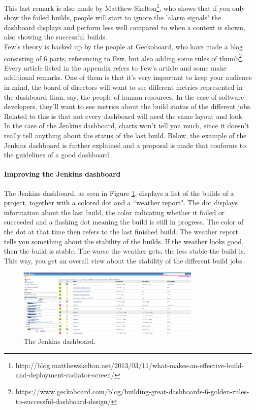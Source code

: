 \documentclass[10pt,a4paper]{article}
\begin{document}
\begin{appendices}
This last remark is also made by Matthew Skelton\footnote{http://blog.matthewskelton.net/2013/03/11/what-makes-an-effective-build-and-deployment-radiator-screen/}, who shows that if you only show the failed builds, people will start to ignore the 'alarm signals' the dashboard displays and perform less well compared to when a context is shown, also showing the successful builds. \\
Few’s theory is backed up by the people at Geckoboard, who have made a blog consisting of 6 parts, referencing to Few, but also adding some rules of thumb\footnote{https://www.geckoboard.com/blog/building-great-dashboards-6-golden-rules-to-successful-dashboard-design/}. Every article listed in the appendix refers to Few’s article and some make additional remarks. 
One of them is that it’s very important to keep your audience in mind, the board of directors will want to see different metrics represented in the dashboard than, say, the people of human resources. 
In the case of software developers, they’ll want to see metrics about the build status of the different jobs. Related to this is that not every dashboard will need the same layout and look. \\
In the case of the Jenkins dashboard, charts won’t tell you much, since it doesn’t really tell anything about the status of the last build. Below, the example of the Jenkins dashboard is further explained and a proposal is made that conforms to the guidelines of a good dashboard.

\paragraph{Improving the Jenkins dashboard}
The Jenkins dashboard, as seen in Figure \ref{jenkins}, displays a list of the builds of a project, together with a colored dot and a ``weather report". The dot displays information about the last build, the color indicating whether it failed or succeeded and a flashing dot meaning the build is still in progress. 
The color of the dot at that time then refers to the last finished build.
The weather report tells you something about the stability of the builds. If the weather looks good, then the build is stable. The worse the weather gets, the less stable the build is. This way, you get an overall view about the stability of the different build jobs.

\begin{figure}[ht!]
\centering
\includegraphics[width=90mm]{CaptureJenkins.png}
\caption{The Jenkins dashboard.} 
\label{jenkins}
\end{figure}
 

\end{appendices}
\end{document}
